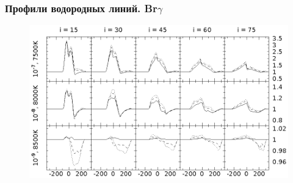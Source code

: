 \documentclass{beamer}
\def\etal{{et~al.}}
\begin{document}
\begin{frame}[noframenumbering]
\frametitle{Профили водородных линий. Br$\gamma$}
\begin{figure}[h]
\centering
\includegraphics[width=\textwidth]{hot_5_Brg.eps}
\end{figure}
\end{frame}









\end{document}
